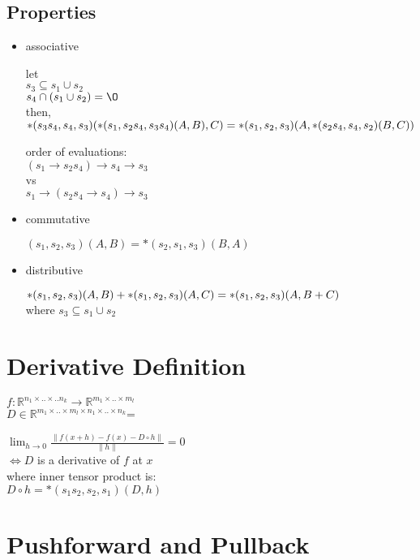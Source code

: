 \documentclass[8pt]{extarticle}
\newcommand{\R}{\mathbb{R}}
\begin{document}
\begin{multicols*}{2}
  \subsection{Properties}

  \begin{itemize}
  \item associative
    
    let\\
    $ s_3 \subseteq s_1 \cup s_2$\\
    $s_4 \cap (s_1 \cup s_2) = \O$\\
    then,\\
    $*(s_3 s_4, s_4, s_3)(*(s_1, s_2 s_4, s_3 s_4)(A,B), C)\\
    =*(s_1, s_2, s_3)(A, *(s_2 s_4, s_4, s_2)(B,C))$

    order of evaluations:\\
    $(s_1 \rightarrow s_2 s_4) \rightarrow s_4 \rightarrow s_3$\\
    vs\\
    $s_1 \rightarrow (s_2 s_4 \rightarrow s_4) \rightarrow s_3$
  \item commutative

    $(s_1,s_2,s_3)(A,B) = *(s_2,s_1,s_3)(B,A)$
  \item distributive

    $*(s_1,s_2,s_3)(A,B) + *(s_1,s_2,s_3)(A,C)\\= *(s_1,s_2,s_3)(A, B+C)$\\
    where $s_3 \subseteq s_1 \cup s_2$
  \end{itemize}

  \section{Derivative Definition}

  $f: \R^{n_1 \times .. \times .. n_k} \rightarrow \R^{m_1 \times .. \times m_l}$\\
  $D \in \R^{m_1 \times .. \times m_l \times n_1 \times .. \times n_k}$=

  $\lim_{h \rightarrow 0} \frac{\| f(x+h) - f(x) - D \circ h\|}{\| h \|} = 0$\\
  $\iff D$ is a derivative of $f$ at $x$\\
  
  where inner tensor product is: \\
  $D \circ h = *(s_1 s_2, s_2, s_1)(D,h)$

  \section{Pushforward and Pullback}


\end{multicols*}
\end{document}
